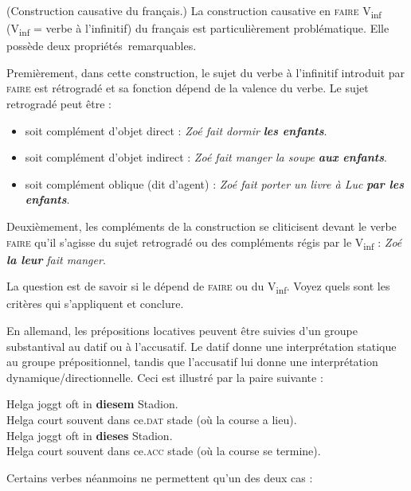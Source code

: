 {     (Construction causative du français.) La construction causative en \textsc{faire} V\textsubscript{inf}
     (V\textsubscript{inf} = verbe à l’infinitif) du français est particulièrement problématique. Elle possède deux propriétés~remarquables.

    Premièrement, dans cette construction, le sujet du verbe à l’infinitif introduit par \textsc{faire} est rétrogradé et sa fonction dépend de la valence du verbe. Le sujet retrogradé peut être :
    \begin{itemize}
    \item  soit complément d’objet direct : \textit{Zoé fait dormir} \textbf{\textit{les enfants}}.
    \item  soit complément d’objet indirect : \textit{Zoé fait manger la soupe} \textbf{\textit{aux enfants}}.
    \item  soit complément oblique (dit d’agent) : \textit{Zoé fait porter un livre à Luc} \textbf{\textit{par les enfants}}.
    \end{itemize}
    Deuxièmement, les compléments de la construction se cliticisent devant le verbe \textsc{faire} qu’il s’agisse du sujet retrogradé ou des compléments régis par le V\textsubscript{inf} : \textit{Zoé} \textbf{\textit{la leur}} \textit{fait manger}.

    La question est de savoir si le  dépend de \textsc{faire} ou du V\textsubscript{inf}. Voyez quels sont les critères qui s’appliquent et conclure.

     En allemand, les prépositions locatives peuvent être suivies d’un groupe substantival au datif ou à l’accusatif. Le datif donne une interprétation statique au groupe prépositionnel, tandis que l’accusatif lui donne une interprétation dynamique/directionnelle. Ceci est illustré par la paire suivante :

    \begin{exe}
    \gll   Helga joggt oft in \textbf{diesem} Stadion.\\
    Helga court souvent dans ce.\textsc{dat} stade (où la course a lieu).\\
    \gll   Helga joggt oft in \textbf{dieses} Stadion.\\
    Helga court souvent dans ce.\textsc{acc} stade (où la course se termine).\\
    \end{exe}
    
   \noindent Certains verbes néanmoins ne permettent qu’un des deux cas :

}
